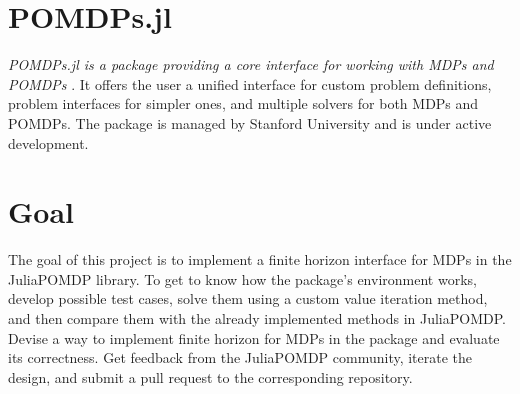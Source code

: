 \section{POMDPs.jl}
\textit{POMDPs.jl is a package providing a core interface for working with MDPs and POMDPs} \cite{JMLR:v18:16-300}. It offers the user a unified interface for custom problem definitions, problem interfaces for simpler ones, and multiple solvers for both MDPs and POMDPs. The package is managed by Stanford University and is under active development.


\section{Goal}
The goal of this project is to implement a finite horizon interface for MDPs in the JuliaPOMDP library. To get to know how the package's environment works, develop possible test cases, solve them using a custom value iteration method, and then compare them with the already implemented methods in JuliaPOMDP. Devise a way to implement finite horizon for MDPs in the package and evaluate its correctness. Get feedback from the JuliaPOMDP community, iterate the design, and submit a pull request to the corresponding repository.

